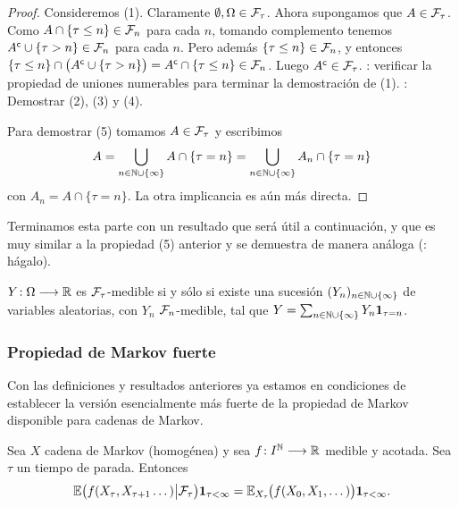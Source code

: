 \begin{proof}
Consideremos (1).
Claramente $\emptyset,\Omega\in\mathcal{F}_\tau$.
Ahora supongamos que $A\in\mathcal{F}_\tau$.
Como $A\cap\{\tau\leq n\}\in\mathcal{F}_n$ para cada $n$, tomando complemento tenemos $A^{\sf c}\cup\{\tau>n\}\in\mathcal{F}_n$ para cada $n$.
Pero además $\{\tau\leq n\}\in\mathcal{F}_n$, y entonces $\{\tau\leq n\}\cap\big(A^{\sf c}\cup\{\tau>n\}\big)=A^{\sf c}\cap\{\tau\leq n\}\in\mathcal{F}_n$.
Luego $A^{\sf c}\in\mathcal{F}_\tau$.
\uexer: verificar la propiedad de uniones numerables para terminar la demostración de (1).
\uexer: Demostrar (2), (3) y (4).

Para demostrar (5) tomamos $A\in\mathcal{F}_\tau$ y escribimos
\[A=\bigcup_{n\in\mathbb{N}\cup\{\infty\}}A\cap\{\tau=n\}=\bigcup_{n\in\mathbb{N}\cup\{\infty\}}A_n\cap\{\tau=n\}\]
con $A_n=A\cap\{\tau=n\}$.
La otra implicancia es aún más directa.
\end{proof}

Terminamos esta parte con un resultado que será útil a continuación, y que es muy similar a la propiedad (5) anterior y se demuestra de manera análoga (\uexers: hágalo).

\begin{lem}\label{lem:Ymed}
$Y\!:\Omega\longrightarrow\mathbb{R}$ es $\mathcal{F}_\tau$-medible si y sólo si existe una sucesión $(Y_n)_{n\in\mathbb{N}\cup\{\infty\}}$ de variables aleatorias, con $Y_n$ $\mathcal{F}_n$-medible, tal que $Y=\sum_{n\in\mathbb{N}\cup\{\infty\}}Y_n\mathbf{1}_{\tau=n}$.
\end{lem}

\subsubsection{Propiedad de Markov fuerte}

Con las definiciones y resultados anteriores ya estamos en condiciones de establecer la versión esencialmente más fuerte de la propiedad de Markov disponible para cadenas de Markov.

\begin{thm}
Sea $X$ cadena de Markov (homogénea) y sea $f\!:I^{\mathbb{N}}\longrightarrow\mathbb{R}$ medible y acotada.
Sea $\tau$ un tiempo de parada.
Entonces
\begin{equation}
\mathbb{E}\big(f(X_{\tau},X_{\tau+1}\dotsc)\big|\mathcal{F}_\tau\big)\mathbf{1}_{\tau<\infty}=\mathbb{E}_{X_\tau}\hspace{-0.1em}\big(f(X_0,X_1,\dotsc)\big)\mathbf{1}_{\tau<\infty}.\label{eq:propMarkF}
\end{equation}
\end{thm}


